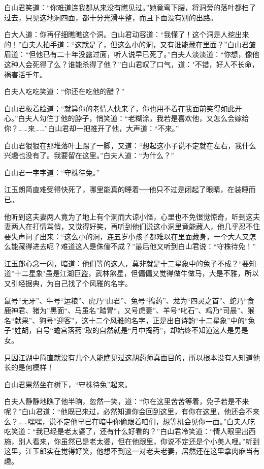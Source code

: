 \documentclass[12pt,oneside]{book}
\begin{document}
白山君笑道：``你难道连我都从来没有瞧见过。''她竟弯下腰，将洞旁的落叶都扫了过去，只见这地洞四面，都十分光滑平整，而且下面没有别的出路。

白大人道：你再仔细瞧瞧这个洞。白山君动容道：``我懂了！这个洞是人挖出来的！''白夫人拍手道：``这就是了，但这么小的洞，又有谁能藏在里面？''白山君皱眉道：``但他已有二十年没露过面，听人说早已死了。''白夫人淡淡道：``你想，像他这种人会死得了么？谁能杀得了他？''白山君叹了口气，道："不错，好人不长命，祸害活千年。

白夫人吃吃笑道：``你还在吃他的醋？''

白山君板着脸道；``就算你的老情人快来了，你也用不着在我面前笑得如此开心。''白夫人勾住丁他的脖子，悄笑道：``老糊涂，我若是喜欢他，又怎么会嫁给你？\ldots\ldots 来\ldots\ldots{}''白山君却一把推开了他，大声道：``不来。''

白山君狠狠在那堆落叶上踢了一脚，又道：``想起这小子说不定就在左右，我什么兴趣也没有了。我要留在这里。''白夫人道：``为什么？''

白山君一字字道：``守株待兔。''

江玉朗简直难受得快死了，哪里能真的睡着──他只不过是闭起了眼睛，在装睡而已。

他听到这夫妻两人竟为了地上有个洞而大谅小怪，心里也不免很觉惊奇，听到这夫妻两人在打情骂俏，又觉得好笑，再听到他们说这小洞里竟能藏人，他几乎忍不住要失声问了出来：``这么小的洞，连五岁小孩子都难以在里面藏身，一个大人又怎么能藏得进去呢？难道这人是侏儒不成？''最后他又听到白山君说：``守株待免！''

江玉郎心念一闪，暗道：他们等的这人，莫非就是十二星象中的兔子不成？``要知道''十二星象"虽是江湖巨盗，武林煞星，但偏偏又觉得做牛做马，大是不雅，所以又引经据典，为自己找了个风雅的名字。

鼠号``无牙''、牛号``运粮''、虎乃``山君''、兔号``捣药''、龙为``四灵之首''、蛇乃``食鹿神君、猪为''黑面``、马虽名''踏胃``，又号虎妻''、羊号``叱石''、鸡乃``司晨''、猴名``献果''、狗号``迎客''，这十二个风雅的名字，正是出自诗韵``十二星象''中的``兔子''姓胡，自号``蟾宫落药''取的自然就是``月中捣药''，却始终不知道这人是男是女。

只因江湖中简直就没有几个人能瞧见过这胡药师真面目的，所以根本没有人知道他长的是何模样！

白山君果然坐在树下，``守株待兔''起来。

白夫人静静地瞧了他半晌，忽然一笑，道：``你在这里苦苦等着，免子若是不来呢？''白山君道：``他既已来过，必然知道你会回到这里，有你在这里，他还会不来么？\ldots\ldots 嘿嘿，说不定他早已在暗中你偷跟着咱们，想等机会见你一面。''白夫人吃吃笑道：``我已经是老太婆了，还有什么好看的？''白山君冷笑道：``情人眼里出西施，别人看来，你虽然已是老太婆，但在他跟里，你说不定还是个小美人哩。''听到这里，江玉郎实在觉得好笑，他想不到这一对老夫老妻，居然还在这里拿肉麻当有趣。
\end{document}
